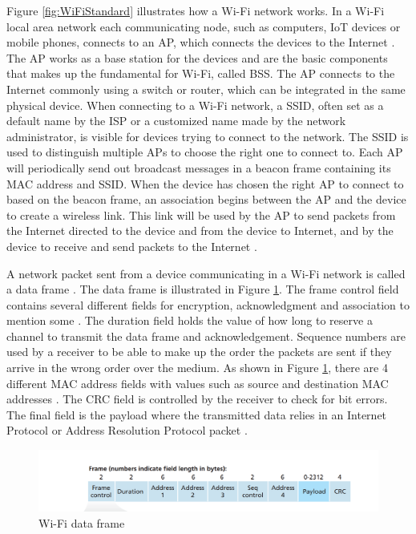 Figure \ref{fig:WiFiStandard} illustrates how a \gls{Wi-Fi} network works. In a \gls{Wi-Fi} local area network each communicating node, such as computers, \gls{IoT} devices or mobile phones, connects to an \gls{AP}, which connects the devices to the Internet \cite{Datacom}. The \gls{AP} works as a base station for the devices and are the basic components that makes up the fundamental for \gls{Wi-Fi}, called \gls{BSS}. The \gls{AP} connects to the Internet commonly using a switch or router, which can be integrated in the same physical device. When connecting to a \gls{Wi-Fi} network, a \gls{SSID}, often set as a default name by the \gls{ISP} or a customized name made by the network administrator, is visible for devices trying to connect to the network. The \gls{SSID} is used to distinguish multiple \gls{AP}s to choose the right one to connect to. Each \gls{AP} will periodically send out broadcast messages in a beacon frame containing its \gls{MAC} address and \gls{SSID}. When the device has chosen the right \gls{AP} to connect to based on the beacon frame, an association begins between the \gls{AP} and the device to create a wireless link. This link will be used by the \gls{AP} to send packets from the Internet directed to the device and from the device to Internet, and by the device to receive and send packets to the Internet \cite{Datacom}. 

A network packet sent from a device communicating in a \gls{Wi-Fi} network is called a data frame \cite{Datacom}. The data frame is illustrated in Figure \ref{fig:WiFiDataframe}. The frame control field contains several different fields for encryption, acknowledgment and association to mention some \cite{Datacom}. The duration field holds the value of how long to reserve a channel to transmit the data frame and acknowledgement. Sequence numbers are used by a receiver to be able to make up the order the packets are sent if they arrive in the wrong order over the medium. As shown in Figure \ref{fig:WiFiDataframe}, there are 4 different \gls{MAC} address fields with values such as source and destination \gls{MAC} addresses \cite{WifiStandard}. The \gls{CRC} field is controlled by the receiver to check for bit errors. The final field is the payload where the transmitted data relies in an Internet Protocol or Address Resolution Protocol packet \cite{Datacom}. 

\begin{figure} [!h]
    \includegraphics[width=1\textwidth]{figures/WifiDataFrame.png}
    \caption{\gls{Wi-Fi} data frame \cite{Datacom}}
    \centering
    \label{fig:WiFiDataframe}
\end{figure}

